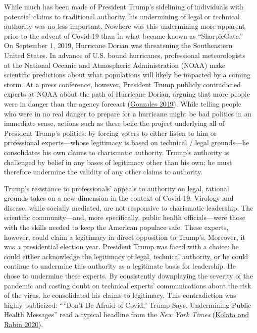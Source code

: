 \documentclass[
  12pt,
]{article}
\begin{document}
While much has been made of President Trump's sidelining of individuals with potential claims to traditional authority, his undermining of legal or technical authority was no less important. Nowhere was this undermining more apparent prior to the advent of Covid-19 than in what became known as ``SharpieGate.'' On September 1, 2019, Hurricane Dorian was threatening the Southeastern United States. In advance of U.S. bound hurricanes, professional meteorologists at the National Oceanic and Atmospheric Administration (NOAA) make scientific predictions about what populations will likely be impacted by a coming storm. At a press conference, however, President Trump publicly contradicted experts at NOAA about the path of Hurricane Dorian, arguing that more people were in danger than the agency forecast (\protect\hyperlink{ref-Gonzales2019}{Gonzales 2019}). While telling people who were in no real danger to prepare for a hurricane might be bad politics in an immediate sense, actions such as these belie the project underlying all of President Trump's politics: by forcing voters to either listen to him or professional experts---whose legitimacy is based on technical / legal grounds---he consolidates his own claims to charismatic authority. Trump's authority is challenged by belief in any bases of legitimacy other than his own; he must therefore undermine the validity of any other claims to authority.

Trump's resistance to professionals' appeals to authority on legal, rational grounds takes on a new dimension in the context of Covid-19. Virology and disease, while socially mediated, are not responsive to charismatic leadership. The scientific community---and, more specifically, public health officials---were those with the skills needed to keep the American populace safe. These experts, however, could claim a legitimacy in direct opposition to Trump's. Moreover, it was a presidential election year. President Trump was faced with a choice: he could either acknowledge the legitimacy of legal, technical authority, or he could continue to undermine this authority as a legitimate basis for leadership. He chose to undermine these experts. By consistently downplaying the severity of the pandemic and casting doubt on technical experts' communications about the risk of the virus, he consolidated his claims to legitimacy. This contradiction was highly publicized: ``\,`Don't Be Afraid of Covid,' Trump Says, Undermining Public Health Messages'' read a typical headline from the \emph{New York Times} (\protect\hyperlink{ref-Kolata2020}{Kolata and Rabin 2020}).
\end{document}
